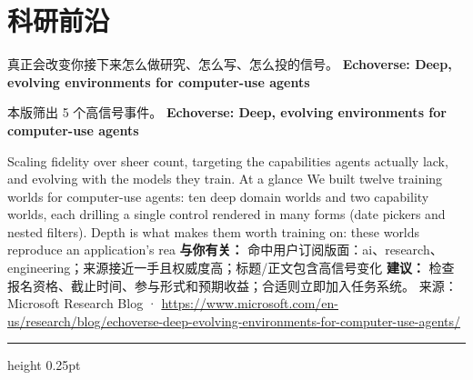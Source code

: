 \documentclass[10.5pt]{ctexart}
\begin{document}
\section*{科研前沿}
{\color{ormuted} 真正会改变你接下来怎么做研究、怎么写、怎么投的信号。}
\vspace{2mm}
{\LARGE\bfseries Echoverse: Deep, evolving environments for computer-use agents}\par
\vspace{1mm}
{\color{ormuted} 本版筛出 5 个高信号事件。}
\vspace{3mm}
{\Large\bfseries Echoverse: Deep, evolving environments for computer-use agents}\par
Scaling fidelity over sheer count, targeting the capabilities agents actually lack, and evolving with the models they train. At a glance We built twelve training worlds for computer-use agents: ten deep domain worlds and two capability worlds, each drilling a single control rendered in many forms (date pickers and nested filters). Depth is what makes them worth training on: these worlds reproduce an application’s rea
\textbf{与你有关：} 命中用户订阅版面：ai、research、engineering；来源接近一手且权威度高；标题/正文包含高信号变化
\textbf{建议：} 检查报名资格、截止时间、参与形式和预期收益；合适则立即加入任务系统。
{\footnotesize\color{ormuted} 来源：Microsoft Research Blog · \url{https://www.microsoft.com/en-us/research/blog/echoverse-deep-evolving-environments-for-computer-use-agents/}}
\vspace{4mm}
\hrule height 0.25pt
\vspace{3mm}
\end{document}
